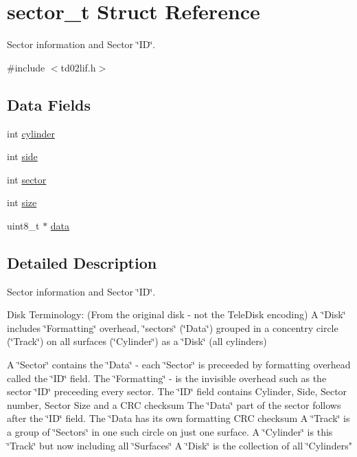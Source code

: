 \hypertarget{structsector__t}{}\section{sector\+\_\+t Struct Reference}
\label{structsector__t}


Sector information and Sector \char`\"{}\+I\+D\char`\"{}.  




{\ttfamily \#include $<$td02lif.\+h$>$}

\subsection*{Data Fields}
\begin{DoxyCompactItemize}
\item 
int \hyperlink{structsector__t_abf5eb245097466ac9624e59a379a2409}{cylinder}
\item 
int \hyperlink{structsector__t_a78a5489776ec87f0146b56bf9ed69ee9}{side}
\item 
int \hyperlink{structsector__t_ac4920b9f7c5e2e9d67f3d2aca7a7191f}{sector}
\item 
int \hyperlink{structsector__t_ab7886bbfbf6610a6324acbff76cd8fe0}{size}
\item 
uint8\+\_\+t $\ast$ \hyperlink{structsector__t_a3a7122a3121eb84094a889be7e6ed042}{data}
\end{DoxyCompactItemize}


\subsection{Detailed Description}
Sector information and Sector \char`\"{}\+I\+D\char`\"{}. 

Disk Terminology\+: (From the original disk -\/ not the Tele\+Disk encoding) A \char`\"{}\+Disk\char`\"{} includes \char`\"{}\+Formatting\char`\"{} overhead, \char`\"{}sectors\char`\"{} (\char`\"{}\+Data\char`\"{}) grouped in a concentry circle (\char`\"{}\+Track\char`\"{}) on all surfaces (\char`\"{}\+Cylinder\char`\"{}) as a \char`\"{}\+Disk\char`\"{} (all cylinders)

A \char`\"{}\+Sector\char`\"{} contains the \char`\"{}\+Data\char`\"{} -\/ each \char`\"{}\+Sector\char`\"{} is preceeded by formatting overhead called the \char`\"{}\+I\+D\char`\"{} field. The \char`\"{}\+Formatting\char`\"{} -\/ is the invisible overhead such as the sector \char`\"{}\+I\+D\char`\"{} preceeding every sector. The \char`\"{}\+I\+D\char`\"{} field contains Cylinder, Side, Sector number, Sector Size and a C\+RC checksum The \char`\"{}\+Data\char`\"{} part of the sector follows after the \char`\"{}\+I\+D\char`\"{} field. The \char`\"{}\+Data has its own formatting C\+R\+C checksum
     A \char`\"{}Track\char`\"{} is a group of \char`\"{}Sectors\char`\"{} in one such circle on just one surface.
     A \char`\"{}Cylinder\char`\"{} is this \char`\"{}Track\char`\"{} but now including all \char`\"{}Surfaces\char`\"{}
     A \char`\"{}Disk\char`\"{} is the collection of all \char`\"{}Cylinders"

